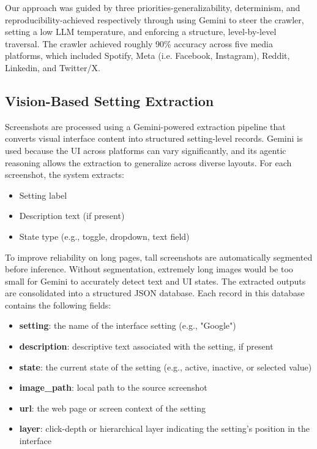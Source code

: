 \documentclass[12pt,letterpaper]{article}
\begin{document}
    Our approach was guided by three priorities-generalizability, determinism, and reproducibility-achieved respectively through using Gemini to steer the crawler, setting a low LLM temperature, and enforcing a structure, level-by-level traversal. The crawler achieved roughly 90\% accuracy across five media platforms, which included Spotify, Meta (i.e. Facebook, Instagram), Reddit, Linkedin, and Twitter/X.
    
    \subsection{Vision-Based Setting Extraction}
    
    Screenshots are processed using a Gemini-powered extraction pipeline that converts visual interface content into structured setting-level records. Gemini is used because the UI across platforms can vary significantly, and its agentic reasoning allows the extraction to generalize across diverse layouts. For each screenshot, the system extracts:
    
    \begin{itemize}
        \item Setting label
        \item Description text (if present)
        \item State type (e.g., toggle, dropdown, text field)
    \end{itemize}
    
   To improve reliability on long pages, tall screenshots are automatically segmented before inference. Without segmentation, extremely long images would be too small for Gemini to accurately detect text and UI states. The extracted outputs are consolidated into a structured JSON database. Each record in this database contains the following fields:

    \begin{itemize}
        \item \textbf{setting}: the name of the interface setting (e.g., "Google")
        \item \textbf{description}: descriptive text associated with the setting, if present
        \item \textbf{state}: the current state of the setting (e.g., active, inactive, or selected value)
        \item \textbf{image\_path}: local path to the source screenshot
        \item \textbf{url}: the web page or screen context of the setting
        \item \textbf{layer}: click-depth or hierarchical layer indicating the setting's position in the interface
    \end{itemize}
    
\end{document}
